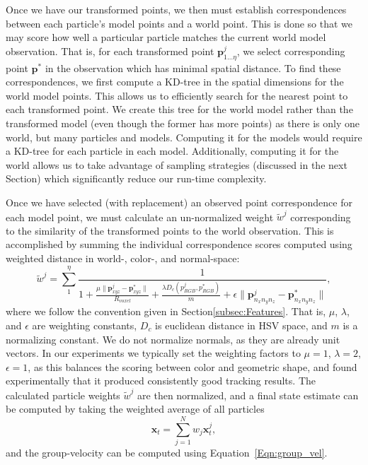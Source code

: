 Once we have our transformed points, we then must establish correspondences between each particle's model points and a world point. This is done so that we may score how well a particular particle matches the current world model observation. That is, for each transformed point $\mathbf{p}^j_{1\dotso \eta}$, we select corresponding point $\mathbf{p}^*$ in the observation which has minimal spatial distance. To find these correspondences, we first compute a KD-tree in the spatial dimensions for the world model points. This allows us to efficiently search for the nearest point to each transformed point. We create this tree for the world model rather than the transformed model (even though the former has more points) as there is only one world, but many particles and models. Computing it for the models would require a KD-tree for each particle in each model. Additionally, computing it for the world allows us to take advantage of sampling strategies (discussed in the next Section) which significantly reduce our run-time complexity. 

Once we have selected (with replacement) an observed point correspondence for each model point, we must calculate an un-normalized weight $\tilde{w}^j$ corresponding to the similarity of the transformed points to the world observation. This is accomplished   by summing the individual correspondence scores computed using weighted distance in world-, color-, and normal-space:
\begin{equation} \label{eqn:distance}
  \tilde{w}^j = \sum_{1}^{\eta} \frac{1}{1 + \frac {\mu \lVert \mathbf{p}^j_{xyz} - \mathbf{p}^*_{xyz} \rVert} {R_{voxel}} +  \frac{\lambda D_c(p^j_{RGB},p^*_{RGB})}{m} +   \epsilon \lVert \mathbf{p}^j_{n_x n_y n_z} - \mathbf{p}^*_{n_x n_y n_z} \rVert}, 
\end{equation}
where we follow the convention given in Section\ref{subsec:Features}. That is, $\mu$, $\lambda$, and $\epsilon$ are weighting constants, $D_c$ is euclidean distance in HSV space, and $m$ is a normalizing constant. We do not normalize normals, as they are already unit vectors. In our experiments we typically set the weighting factors to $\mu=1$, $\lambda=2$, $\epsilon=1$, as this balances the scoring between color and geometric shape, and found experimentally that it produced consistently good tracking results. The calculated particle weights $\tilde{w}^j$ are then normalized, and a final state estimate can be computed by taking the weighted average of all particles
\begin{equation} 
\mathbf{x}_t = \sum_{j=1}^{N} w_j \mathbf{x}^j_{t}, 
\end{equation}
and the group-velocity can be computed using Equation~\ref{Eqn:group_vel}.


